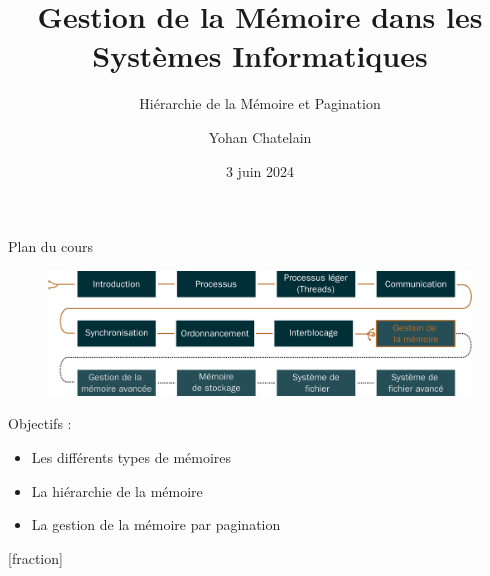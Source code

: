 \documentclass[8pt]{beamer}
\title{Gestion de la Mémoire dans les Systèmes Informatiques}
\subtitle{Hiérarchie de la Mémoire et Pagination}
\author{Yohan Chatelain}
\institute{Polytechnique Montr\'eal}
\date{3 juin 2024}
\begin{document}
\begin{frame}
    \titlepage
\end{frame}

\begin{frame}{Plan du cours}
    \begin{figure}
        \centering
        \includegraphics[width=\textwidth]{figures/plan_cours.pdf}
    \end{figure}
    \vfill
    \begin{block}{Objectifs : }

        \begin{itemize}
            \item Les différents types de mémoires
            \item La hiérarchie de la mémoire
            \item La gestion de la mémoire par pagination
        \end{itemize}
    \end{block}
\end{frame}

\addtocounter{framenumber}{-2}
[fraction]
\end{document}

